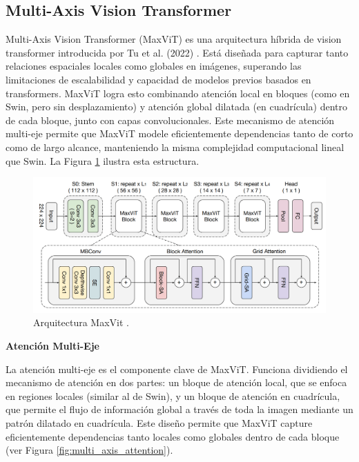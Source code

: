 \documentclass[a4paper,10pt]{book}
\begin{document}
\subsection{Multi-Axis Vision Transformer}

Multi-Axis Vision Transformer (MaxViT) es una arquitectura híbrida de vision transformer introducida por Tu et al. (2022) \cite{tu_maxvit_2022}. Está diseñada para capturar tanto relaciones espaciales locales como globales en imágenes, superando las limitaciones de escalabilidad y capacidad de modelos previos basados en transformers. MaxViT logra esto combinando atención local en bloques (como en Swin, pero sin desplazamiento) y atención global dilatada (en cuadrícula) dentro de cada bloque, junto con capas convolucionales. Este mecanismo de atención multi-eje permite que MaxViT modele eficientemente dependencias tanto de corto como de largo alcance, manteniendo la misma complejidad computacional lineal que Swin. La Figura \ref{fig:max_vit_arch} ilustra esta estructura.

\begin{figure}[h!]
\centering
\includegraphics[width=1.0\linewidth]{reports//assets/maxvit_arch.png}
\caption[Multi-Axis Vision Transformer Arch]{Arquitectura MaxVit \cite{tu_maxvit_2022}.}
\label{fig:max_vit_arch}
\end{figure}

\textbf{Atención Multi-Eje}

La atención multi-eje es el componente clave de MaxViT. Funciona dividiendo el mecanismo de atención en dos partes: un bloque de atención local, que se enfoca en regiones locales (similar al de Swin), y un bloque de atención en cuadrícula, que permite el flujo de información global a través de toda la imagen mediante un patrón dilatado en cuadrícula. Este diseño permite que MaxViT capture eficientemente dependencias tanto locales como globales dentro de cada bloque (ver Figura \ref{fig:multi_axis_attention}).
\end{document}
